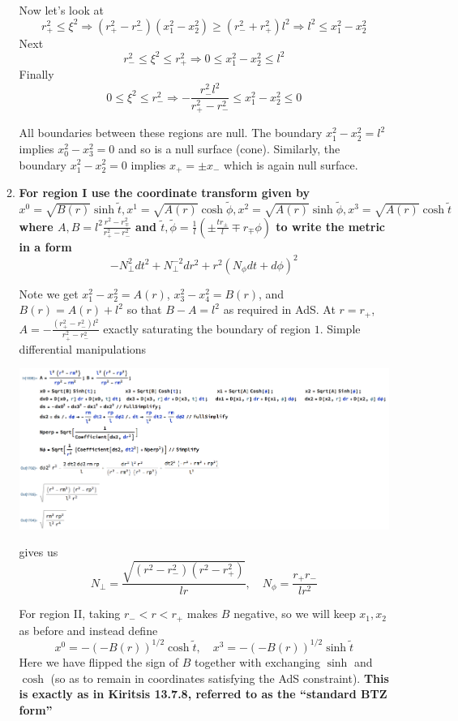\documentclass[11pt, class=article, crop=false]{standalone}
\begin{document}
\begin{enumerate}
\begin{enumerate}
		 Now let's look at 
		\[
			r_+^2 \leq \xi^2 \Rightarrow (r_+^2 - r_-^2)(x_1^2 - x_2^2) \geq (r_-^2 + r_+^2) l^2 \Rightarrow l^2 \leq x_1^2 - x_2^2 
		\]
		Next
		\[
			r_-^2 \leq \xi^2 \leq r_+^2 \Rightarrow 0 \leq x_1^2 - x_2^2 \leq l^2
		\]
		Finally 
		\[
			0 \leq \xi^2 \leq r_-^2 \Rightarrow - \frac{r_-^2 l^2}{r_+^2 - r_-^2} \leq x_1^2 - x_2^2 \leq 0
		\]
	
		All boundaries between these regions are null. The boundary $x_1^2 - x_2^2 = l^2$ implies $x_0^2 - x_3^2 =0$ and so is a null surface (cone). 
		Similarly, the boundary $x_1^2 - x_2^2 = 0$ implies $x_+ = \pm x_-$ which is again null surface. 
	
		\item \textbf{For region I use the coordinate transform given by $x^0 = \sqrt{B(r)} \sinh \tilde t, x^1 = \sqrt{A(r)} \cosh \tilde \phi, x^2 = \sqrt{A(r)} \sinh \tilde \phi, x^3 = \sqrt{A(r)} \cosh \tilde t$ where $A,B = l^2 \frac{r^2 - r^2_\mp}{r^2_+ - r^2_-}$ and $\tilde t, \tilde \phi = \frac{1}{l} (\pm \frac{t r_\pm}{l} \mp r_\mp \phi)$ to write the metric in a form}
		\[
			-N_\perp^2 dt^2 + N_\perp^{-2} dr^2 + r^2 (N_\phi dt + d\phi)^2
		\]
		
		Note we get $x_1^2 - x_2^2 = A(r)$, $x_3^2 - x_4^2 = B(r)$, and $B(r) = A(r) + l^2$ so that $B - A = l^2$ as required in AdS. At $r = r_+$, $A = - \frac{(r_+^2 - r_-^2) l^2}{r_+^2 - r_-^2}$ exactly saturating the boundary of region $1$. Simple differential manipulations
		\begin{center}
			\includegraphics[scale=0.5]{"Figures/BTZ metric"}
		\end{center}
		gives us
		\[
			N_{\perp} = \frac{\sqrt{(r^2 - r_-^2)(r^2 - r_+^2)}}{l r}, \quad N_{\phi} = \frac{r_+ r_-}{l r^2}
		\]
	
		For region II, taking $r_- < r < r_+$ makes $B$ negative, so we will keep $x_1, x_2$ as before and instead define 
		\[
			x^0 = -(-B(r))^{1/2} \cosh \tilde t, \quad x^3 = -(-B(r))^{1/2} \sinh \tilde t
		\]
		Here we have flipped the sign of $B$ together with exchanging $\sinh$ and $\cosh$ (so as to remain in coordinates satisfying the AdS constraint). 
		\textbf{This is exactly as in Kiritsis 13.7.8, referred to as the ``standard BTZ form''}
	

\end{enumerate}
\end{enumerate}
\end{document}
